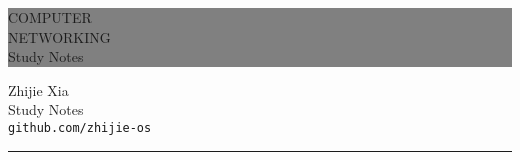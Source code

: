 \begin{titlepage} %
	
	
	\colorbox{grey}{
		\parbox[t]{0.93\textwidth}{ %
			\parbox[t]{0.91\textwidth}{ %
				\raggedleft %
				\fontsize{50pt}{80pt}\selectfont %
				\vspace{0.4cm} %
				
				COMPUTER\\
				NETWORKING\\
                Study Notes\\
				
				\vspace{0.4cm} %
			}
		}
	}
	
	\vfill %
	
	
	\parbox[t]{0.93\textwidth}{ %
		\raggedleft %
		\large %
		{\Large Zhijie Xia}\\[4pt] %
		Study Notes\\
		\texttt{github.com/zhijie-os}\\
		
		\hfill\rule{0.2\linewidth}{1pt}%
	}
	
\end{titlepage}